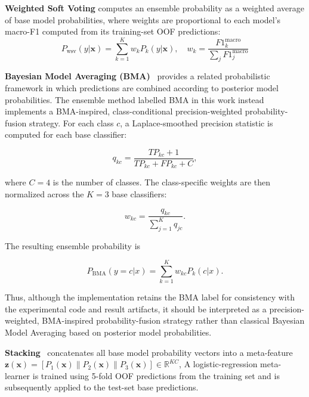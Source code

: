 \documentclass[11pt,a4paper]{article}
\begin{document}
\textbf{Weighted Soft Voting} computes an ensemble
probability as a weighted average of base model probabilities, where weights are proportional to each model’s macro-F1 computed from its training-set OOF predictions:
\begin{equation}
  P_{\text{wsv}}(y|\mathbf{x}) = \sum_{k=1}^{K} w_k P_k(y|\mathbf{x}), \quad
  w_k = \frac{F1_k^{\text{macro}}}{\sum_j F1_j^{\text{macro}}}
  \label{eq:wsv}
\end{equation}

\textbf{Bayesian Model Averaging (BMA)}~\cite{hoeting1999} provides a related
probabilistic framework in which predictions are combined according to
posterior model probabilities. The ensemble method labelled BMA in this
work instead implements a BMA-inspired, class-conditional
precision-weighted probability-fusion strategy. For each class $c$, a
Laplace-smoothed precision statistic is computed for each base classifier:

\begin{equation}
q_{kc} =
\frac{TP_{kc}+1}{TP_{kc}+FP_{kc}+C},
\end{equation}

where $C=4$ is the number of classes. The class-specific weights are then
normalized across the $K=3$ base classifiers:

\begin{equation}
w_{kc} =
\frac{q_{kc}}{\sum_{j=1}^{K}q_{jc}}.
\end{equation}

The resulting ensemble probability is

\begin{equation}
P_{\mathrm{BMA}}(y=c|x)
=
\sum_{k=1}^{K}w_{kc}P_k(c|x).
\end{equation}

Thus, although the implementation retains the BMA label for consistency
with the experimental code and result artifacts, it should be interpreted
as a precision-weighted, BMA-inspired probability-fusion strategy rather
than classical Bayesian Model Averaging based on posterior model
probabilities.

\textbf{Stacking}~\cite{wolpert1992} concatenates all base model probability
vectors into a meta-feature $\mathbf{z}(\mathbf{x}) = [P_1(\mathbf{x})\|P_2(\mathbf{x})\|P_3(\mathbf{x})]
\in \mathbb{R}^{KC}$, A logistic-regression meta-learner is trained using 5-fold OOF
predictions from the training set and is subsequently applied to the test-set base predictions.
\end{document}
